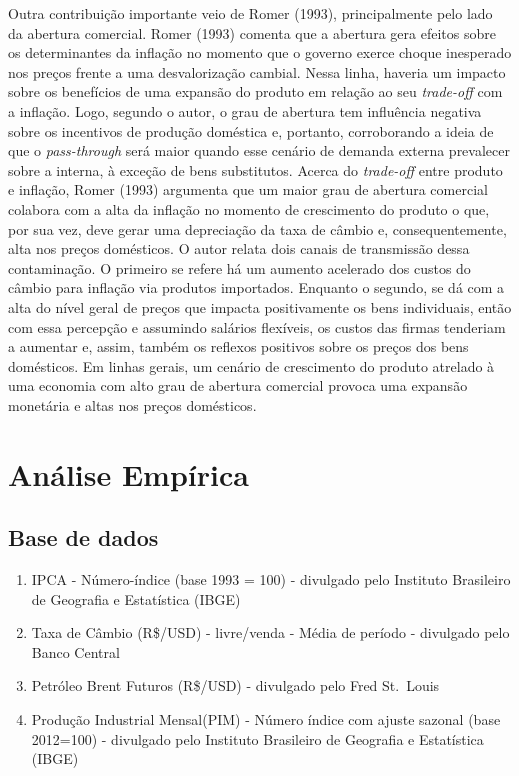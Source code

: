 \documentclass[12pt]{article}
\begin{document}
Outra contribuição importante veio de Romer (1993), principalmente pelo
lado da abertura comercial. Romer (1993) comenta que a abertura gera
efeitos sobre os determinantes da inflação no momento que o governo
exerce choque inesperado nos preços frente a uma desvalorização cambial.
Nessa linha, haveria um impacto sobre os benefícios de uma expansão do
produto em relação ao seu \emph{trade-off} com a inflação. Logo, segundo
o autor, o grau de abertura tem influência negativa sobre os incentivos
de produção doméstica e, portanto, corroborando a ideia de que o
\emph{pass-through} será maior quando esse cenário de demanda externa
prevalecer sobre a interna, à exceção de bens substitutos. Acerca do
\emph{trade-off} entre produto e inflação, Romer (1993) argumenta que um
maior grau de abertura comercial colabora com a alta da inflação no
momento de crescimento do produto o que, por sua vez, deve gerar uma
depreciação da taxa de câmbio e, consequentemente, alta nos preços
domésticos. O autor relata dois canais de transmissão dessa
contaminação. O primeiro se refere há um aumento acelerado dos custos do
câmbio para inflação via produtos importados. Enquanto o segundo, se dá
com a alta do nível geral de preços que impacta positivamente os bens
individuais, então com essa percepção e assumindo salários flexíveis, os
custos das firmas tenderiam a aumentar e, assim, também os reflexos
positivos sobre os preços dos bens domésticos. Em linhas gerais, um
cenário de crescimento do produto atrelado à uma economia com alto grau
de abertura comercial provoca uma expansão monetária e altas nos preços
domésticos.

\hypertarget{anuxe1lise-empuxedrica}{%
\section{Análise Empírica}\label{anuxe1lise-empuxedrica}}

\hypertarget{base-de-dados}{%
\subsection{Base de dados}\label{base-de-dados}}

\begin{enumerate}
\def\labelenumi{\arabic{enumi}.}
\item
  IPCA - Número-índice (base 1993 = 100) - divulgado pelo Instituto
  Brasileiro de Geografia e Estatística (IBGE)
\item
  Taxa de Câmbio (R\$/USD) - livre/venda - Média de período - divulgado
  pelo Banco Central
\item
  Petróleo Brent Futuros (R\$/USD) - divulgado pelo Fred St.~Louis
\item
  Produção Industrial Mensal(PIM) - Número índice com ajuste sazonal
  (base 2012=100) - divulgado pelo Instituto Brasileiro de Geografia e
  Estatística (IBGE)
\end{enumerate}
\end{document}
